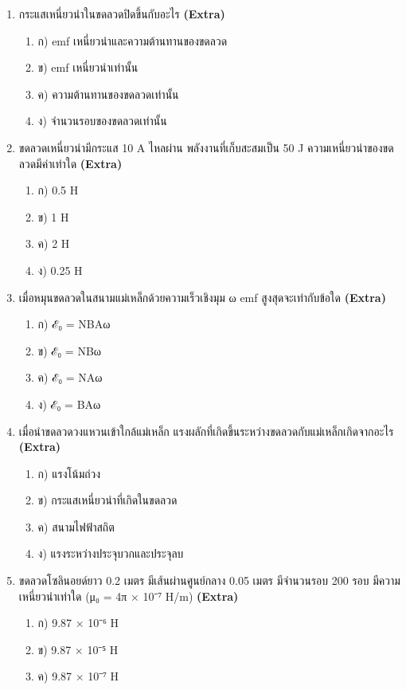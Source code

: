 \documentclass[12pt]{article}
\begin{document}
\begin{enumerate}[label=\arabic*.]
\begin{enumerate}[label=)]
\end{enumerate}
\item กระแสเหนี่ยวนำในขดลวดปิดขึ้นกับอะไร \hfill \textbf{\small (Extra)}
\begin{enumerate}[label=)]
\item ก) emf เหนี่ยวนำและความต้านทานของขดลวด
\item ข) emf เหนี่ยวนำเท่านั้น
\item ค) ความต้านทานของขดลวดเท่านั้น
\item ง) จำนวนรอบของขดลวดเท่านั้น
\end{enumerate}
\item ขดลวดเหนี่ยวนำมีกระแส 10 A ไหลผ่าน พลังงานที่เก็บสะสมเป็น 50 J ความเหนี่ยวนำของขดลวดมีค่าเท่าใด \hfill \textbf{\small (Extra)}
\begin{enumerate}[label=)]
\item ก) 0.5 H
\item ข) 1 H
\item ค) 2 H
\item ง) 0.25 H
\end{enumerate}
\item เมื่อหมุนขดลวดในสนามแม่เหล็กด้วยความเร็วเชิงมุม ω emf สูงสุดจะเท่ากับข้อใด \hfill \textbf{\small (Extra)}
\begin{enumerate}[label=)]
\item ก) ℰ₀ = NBAω
\item ข) ℰ₀ = NBω
\item ค) ℰ₀ = NAω
\item ง) ℰ₀ = BAω
\end{enumerate}
\item เมื่อนำขดลวดวงแหวนเข้าใกล้แม่เหล็ก แรงผลักที่เกิดขึ้นระหว่างขดลวดกับแม่เหล็กเกิดจากอะไร \hfill \textbf{\small (Extra)}
\begin{enumerate}[label=)]
\item ก) แรงโน้มถ่วง
\item ข) กระแสเหนี่ยวนำที่เกิดในขดลวด
\item ค) สนามไฟฟ้าสถิต
\item ง) แรงระหว่างประจุบวกและประจุลบ
\end{enumerate}
\item ขดลวดโซลินอยด์ยาว 0.2 เมตร มีเส้นผ่านศูนย์กลาง 0.05 เมตร มีจำนวนรอบ 200 รอบ มีความเหนี่ยวนำเท่าใด (μ₀ = 4π × 10⁻⁷ H/m) \hfill \textbf{\small (Extra)}
\begin{enumerate}[label=)]
\item ก) 9.87 × 10⁻⁶ H
\item ข) 9.87 × 10⁻⁵ H
\item ค) 9.87 × 10⁻⁷ H

\end{enumerate}
\end{enumerate}
\end{document}
